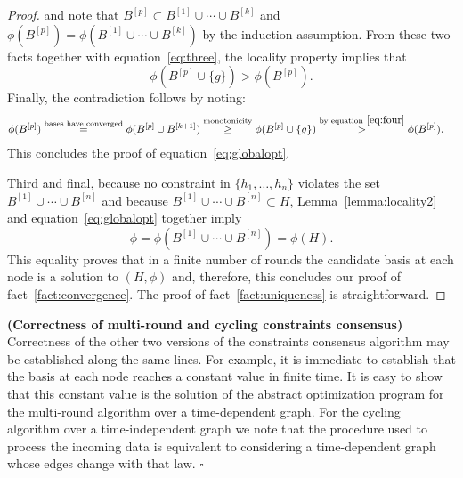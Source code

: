 \documentclass[onecolumn,journal,letterpaper]{IEEEtran}
\newcommand{\union}{\cup}
\newcommand{\supind}[2]{{#1}^{[#2]}}
\newcommand\oprocendsymbol{\hbox{$\square$}}
\newcommand\oprocend{\relax\ifmmode\else\unskip\hfill\fi\oprocendsymbol}
\begin{document}
\begin{proof}
   and note that $\supind{B}{p} \subset \supind{B}{1}\union\cdots \union
   \supind{B}{k}$ and $\phi(\supind{B}{p}) = \phi(
   \supind{B}{1}\union\cdots \union \supind{B}{k})$ by the induction
   assumption. From these two facts together with
   equation~\eqref{eq:three}, the locality property implies that
   \begin{equation}
     \label{eq:four}
     \phi(\supind{B}{p}\union\{g\}) >  \phi(\supind{B}{p}).
   \end{equation}
   Finally, the contradiction follows by noting:
   \begin{align*}
     \label{eq:six}
     \phi(\supind{B}{p}) &\overset{\text{bases have converged}}{=}
     \phi(\supind{B}{p}\union \supind{B}{k+1})
\overset{\text{monotonicity}}{\geq}
     \phi(\supind{B}{p}\union \{g\})
\overset{\text{by equation}~\eqref{eq:four}}{>} \phi(\supind{B}{p}).
   \end{align*}
   This concludes the proof of equation~\eqref{eq:globalopt}.

   Third and final, because no constraint in $\{h_1,\ldots,h_n\}$ violates
   the set $\supind{B}{1}\union\cdots\union\supind{B}{n}$ and because
   $\supind{B}{1}\union\cdots\union\supind{B}{n} \subset H$,
   Lemma~\ref{lemma:locality2} and equation~\eqref{eq:globalopt} together
   imply
   \begin{equation*}
     \bar{\phi} = \phi(\supind{B}{1}\union\cdots\union\supind{B}{n})
     =\phi(H).
   \end{equation*}
   This equality proves that in a finite number of rounds the candidate
   basis at each node is a solution to $(H,\phi)$ and, therefore, this
   concludes our proof of fact~\ref{fact:convergence}.  The proof of
   fact~\ref{fact:uniqueness} is straightforward.
 \end{proof}

\begin{remark}\textbf{\textup{(Correctness of multi-round and cycling constraints consensus)}}
  Correctness of the other two versions of the constraints consensus
  algorithm may be established along the same lines. For example, it is
  immediate to establish that the basis at each node reaches a constant
  value in finite time.  It is easy to show that this constant value is the
  solution of the abstract optimization program for the multi-round algorithm
  over a time-dependent graph.  For the cycling algorithm over a
  time-independent graph we note that the procedure used to process the
  incoming data is equivalent to considering a time-dependent graph whose
  edges change with that law.  \oprocend
\end{remark}
\end{document}
